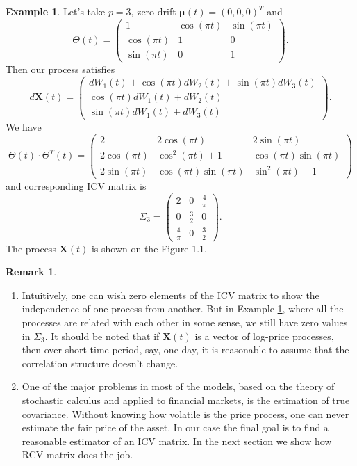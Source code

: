 \documentclass[a4paper,11pt]{book}
\theoremstyle{plain}
\theoremstyle{definition}
\newtheorem{exmp}[thm]{Example}
\newtheorem{rmrk}[thm]{Remark}
\begin{document}
	\begin{exmp} \label{exmp X3}
	    Let's take $p = 3$, zero drift $\boldsymbol{\mu}(t) = (0, 0, 0)^T$ and 
		\[ \Theta(t) = \begin{pmatrix}
		1 & \cos(\pi t) & \sin (\pi t) \\
		\cos(\pi t) & 1 & 0 \\
		\sin (\pi t) & 0 & 1
		\end{pmatrix}. \]
		Then our process satisfies
		\[ d\mathbf{X}(t) = \begin{pmatrix}
		dW_1(t)+\cos(\pi t) dW_2(t) +\sin(\pi t)dW_3(t)  \\
	    \cos(\pi t) dW_1(t) + dW_2(t) \\
		\sin(\pi t) dW_1(t)+ dW_3(t)
		\end{pmatrix}. \]
		We have
		\[ \Theta(t) \cdot \Theta^T(t) = \begin{pmatrix}
		2 & 2\cos(\pi t) & 2\sin (\pi t) \\
		2\cos(\pi t) & \cos^2(\pi t) + 1 & \cos(\pi t)\sin(\pi t) \\
		2\sin (\pi t) & \cos(\pi t)\sin(\pi t) & \sin^2(\pi t)+1
		\end{pmatrix} \]
		and corresponding ICV matrix is
		\[ \Sigma_3 = \begin{pmatrix}
		2 & 0 & \frac{4}{\pi} \\
		0 & \frac{3}{2} & 0 \\
		\frac{4}{\pi} & 0 & \frac{3}{2}
		\end{pmatrix}. \]
		The process $\mathbf{X}(t)$ is shown on the Figure 1.1.
	\end{exmp}
	
	\begin{rmrk} \
		\begin{enumerate}
			\item 
			Intuitively, one can wish zero elements of the ICV matrix to show the independence of one process from another. But in Example \ref{exmp X3}, where all the processes are related with each other in some sense, we still have zero values in $\Sigma_3$. It should be noted that if $\mathbf{X}(t)$ is a vector of log-price processes, then over short time period, say, one day, it is reasonable to assume that the correlation structure doesn't change.
			\item One of the major problems in most of the models, based on the theory of stochastic calculus and applied to financial markets, is the estimation of true covariance. Without knowing how volatile is the price process, one can never estimate the fair price of the asset. In our case the final goal is to find a reasonable estimator of an ICV matrix. In the next section we show how RCV matrix does the job.
		\end{enumerate}
	\end{rmrk}
	
\end{document}
